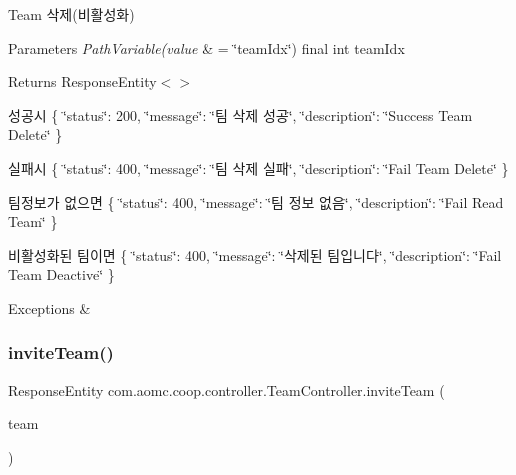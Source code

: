 Team 삭제(비활성화)


\begin{DoxyParams}{Parameters}
{\em Path\+Variable(value} & = \char`\"{}team\+Idx\char`\"{}) final int team\+Idx\\
\hline
\end{DoxyParams}
\begin{DoxyReturn}{Returns}
Response\+Entity$<$$>$
\end{DoxyReturn}
성공시 \{ \char`\"{}status\char`\"{}\+: 200, \char`\"{}message\char`\"{}\+: \char`\"{}팀 삭제 성공\char`\"{}, \char`\"{}description\char`\"{}\+: \char`\"{}\+Success Team Delete\char`\"{} \}

실패시 \{ \char`\"{}status\char`\"{}\+: 400, \char`\"{}message\char`\"{}\+: \char`\"{}팀 삭제 실패\char`\"{}, \char`\"{}description\char`\"{}\+: \char`\"{}\+Fail Team Delete\char`\"{} \}

팀정보가 없으면 \{ \char`\"{}status\char`\"{}\+: 400, \char`\"{}message\char`\"{}\+: \char`\"{}팀 정보 없음\char`\"{}, \char`\"{}description\char`\"{}\+: \char`\"{}\+Fail Read Team\char`\"{} \}

비활성화된 팀이면 \{ \char`\"{}status\char`\"{}\+: 400, \char`\"{}message\char`\"{}\+: \char`\"{}삭제된 팀입니다\char`\"{}, \char`\"{}description\char`\"{}\+: \char`\"{}\+Fail Team Deactive\char`\"{} \}


\begin{DoxyExceptions}{Exceptions}
{\em } & \\
\hline
\end{DoxyExceptions}
\mbox{\label{classcom_1_1aomc_1_1coop_1_1controller_1_1_team_controller_ae2bf50a2db266b377c7d7cbdf178231d}} 
\subsubsection{\texorpdfstring{inviteTeam()}{inviteTeam()}}
{\footnotesize\ttfamily Response\+Entity com.\+aomc.\+coop.\+controller.\+Team\+Controller.\+invite\+Team (\begin{DoxyParamCaption}\item[{@Request\+Body final Team}]{team }\end{DoxyParamCaption})}



